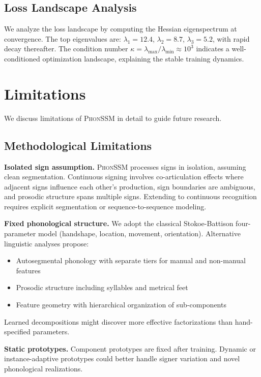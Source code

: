 \documentclass{article}
\newcommand{\phonssm}{\textsc{PhonSSM}}
\begin{document}
\subsection{Loss Landscape Analysis}

We analyze the loss landscape by computing the Hessian eigenspectrum at convergence. The top eigenvalues are: $\lambda_1 = 12.4$, $\lambda_2 = 8.7$, $\lambda_3 = 5.2$, with rapid decay thereafter. The condition number $\kappa = \lambda_{\max}/\lambda_{\min} \approx 10^3$ indicates a well-conditioned optimization landscape, explaining the stable training dynamics.

\section{Limitations}
\label{app:limitations}

We discuss limitations of \phonssm{} in detail to guide future research.

\subsection{Methodological Limitations}

\textbf{Isolated sign assumption.} \phonssm{} processes signs in isolation, assuming clean segmentation. Continuous signing involves co-articulation effects where adjacent signs influence each other's production, sign boundaries are ambiguous, and prosodic structure spans multiple signs. Extending to continuous recognition requires explicit segmentation or sequence-to-sequence modeling.

\textbf{Fixed phonological structure.} We adopt the classical Stokoe-Battison four-parameter model (handshape, location, movement, orientation). Alternative linguistic analyses propose:
\begin{itemize}[nosep,topsep=2pt,leftmargin=*]
\item Autosegmental phonology with separate tiers for manual and non-manual features
\item Prosodic structure including syllables and metrical feet
\item Feature geometry with hierarchical organization of sub-components
\end{itemize}
Learned decompositions might discover more effective factorizations than hand-specified parameters.

\textbf{Static prototypes.} Component prototypes are fixed after training. Dynamic or instance-adaptive prototypes could better handle signer variation and novel phonological realizations.
\end{document}
